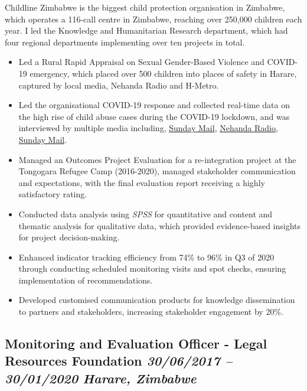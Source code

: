 \documentclass[
  10pt,
]{article}
\providecommand{\tightlist}{%
  \setlength{\itemsep}{0pt}\setlength{\parskip}{0pt}}
\begin{document}
Childline Zimbabwe is the biggest child protection organisation in Zimbabwe, which operates a 116-call centre in Zimbabwe, reaching over 250,000 children each year. I led the Knowledge and Humanitarian Research department, which had four regional departments implementing over ten projects in total.

\begin{itemize}
\tightlist
\item
Led a Rural Rapid Appraisal on Sexual Gender-Based Violence and COVID-19 emergency, which placed over 500 children into places of safety in Harare, captured by local media, Nehanda Radio and H-Metro.
\item
Led the organisational COVID-19 response and collected real-time data on the high rise of child abuse cases during the COVID-19 lockdown, and was interviewed by multiple media including, \href{https://www.sundaymail.co.zw/is-your-child-safe-shocking-rise-in-child-abuse-cases}{Sunday Mail}, \href{https://nehandaradio.com/2020/04/17/62-children-removed-from-the-streets/}{Nehanda Radio}, \href{https://www.sundaymail.co.zw/school-misdemeanours-tip-of-the-iceberg}{Sunday Mail}.
\item
Managed an Outcomes Project Evaluation for a re-integration project at the Tongogara Refugee Camp (2016-2020), managed stakeholder communication and expectations, with the final evaluation report receiving a highly satisfactory rating.
\item
Conducted data analysis using \emph{SPSS} for quantitative and content and thematic analysis for qualitative data, which provided evidence-based insights for project decision-making.
\item
Enhanced indicator tracking efficiency from 74\% to 96\% in Q3 of 2020 through conducting scheduled monitoring visits and spot checks, ensuring implementation of recommendations.
\item
Developed customised communication products for knowledge dissemination to partners and stakeholders, increasing stakeholder engagement by 20\%.
\end{itemize}

\subsection{\texorpdfstring{Monitoring and Evaluation Officer - Legal Resources Foundation \emph{30/06/2017 -- 30/01/2020} \textbar{} \emph{Harare, Zimbabwe}}{Monitoring and Evaluation Officer - Legal Resources Foundation 30/06/2017 -- 30/01/2020 \textbar{} Harare, Zimbabwe}}\label{monitoring-and-evaluation-officer---legal-resources-foundation-30062017-30012020-harare-zimbabwe}
\end{document}
